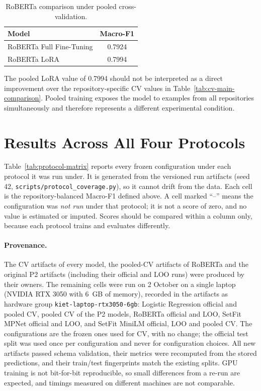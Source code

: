 \begin{table}[H]
\centering
\caption{RoBERTa comparison under pooled cross-validation.}
\label{tab:pooled-roberta-comparison}
\begin{tabular}{lc}
\toprule
\textbf{Model} & \textbf{Macro-F1} \\
\midrule
RoBERTa Full Fine-Tuning & 0.7924 \\
RoBERTa LoRA & 0.7994 \\
\bottomrule
\end{tabular}
\end{table}

The pooled LoRA value of 0.7994 should not be interpreted as a direct improvement over the repository-specific CV values in Table~\ref{tab:cv-main-comparison}. Pooled training exposes the model to examples from all repositories simultaneously and therefore represents a different experimental condition.

\section{Results Across All Four Protocols}
Table~\ref{tab:protocol-matrix} reports every frozen configuration under each protocol it was run under. It is generated from the versioned run artifacts (seed 42, \texttt{scripts/protocol\_coverage.py}), so it cannot drift from the data. Each cell is the repository-balanced Macro-F1 defined above. A cell marked ``--'' means the configuration was \emph{not run} under that protocol; it is not a score of zero, and no value is estimated or imputed. Scores should be compared within a column only, because each protocol trains and evaluates differently.

\begin{table}[H]
\centering
\caption{Macro-F1 of the frozen configurations under the four protocols (seed 42). Bold marks the best score in each column.}
\label{tab:protocol-matrix}

\end{table}

\paragraph{Provenance.} The CV artifacts of every model, the pooled-CV artifacts of RoBERTa and the original P2 artifacts (including their official and LOO runs) were produced by their owners. The remaining cells were run on 2 October on a single laptop (NVIDIA RTX 3050 with 6~GB of memory), recorded in the artifacts as hardware group \texttt{kiet-laptop-rtx3050-6gb}: Logistic Regression official and pooled CV, pooled CV of the P2 models, RoBERTa official and LOO, SetFit MPNet official and LOO, and SetFit MiniLM official, LOO and pooled CV. The configurations are the frozen ones used for CV, with no change; the official test split was used once per configuration and never for configuration choices. All new artifacts passed schema validation, their metrics were recomputed from the stored predictions, and their train/test fingerprints match the existing splits. GPU training is not bit-for-bit reproducible, so small differences from a re-run are expected, and timings measured on different machines are not comparable.

